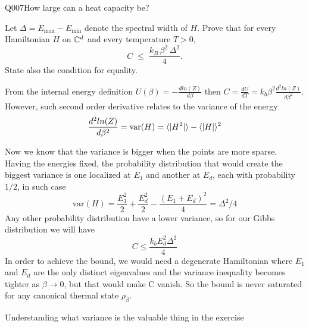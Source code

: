 \begin{entry}{Q007}{How large can a heat capacity be?}


\begin{problem}
Let $\Delta=E_{\max}-E_{\min}$ denote the spectral width of $H$. Prove that for every
Hamiltonian $H$ on $\mathbb{C}^{d}$ and every temperature $T>0$,
\[
  C \;\le\; \frac{k_B\,\beta^{2}\,\Delta^{2}}{4}.
\]
State also the condition for equality.
\end{problem}


\begin{solution}
From the internal energy definition
$U(\beta)= - \frac{ d ln(Z)}{d\beta}$
then
$C= \frac{dU}{dT}= k_b\beta^2 \frac{d^2 ln(Z)}{d\beta^2}.$
However, such second order derivative relates to the variance of the energy 
$$\frac{d^2 ln(Z)}{d\beta^2} = \text{var}(H)= \langle  \vert H^2 \vert  \rangle - \langle  \vert H \vert  \rangle^2 $$

Now we know that the variance is bigger when the points are more sparse. Having the energies fixed, the probability distribution that would create the biggest variance is one localized at $E_1$ and another at $E_d$, each with probability $1/2$, in such case 
$$\text{var}(H) = \frac{E_1^2}{2} + \frac{E_d^2}{2} - \frac{(E_1 + E_d)^2}{4} = \Delta^2/4$$
Any other probability distribution have a lower variance, so for our Gibbs distribution we will have
$$C \leq \frac{k_b E_d^2\Delta^2}{4}$$
In order to achieve the bound, we would need a degenerate Hamiltonian where $E_1$ and $E_d$ are the only distinct eigenvalues and the variance inequality becomes tighter as $\beta \rightarrow 0$, but that would make C vanish. So the bound is never saturated for any canonical thermal state $\rho_\beta$.
\end{solution}

\begin{takeaway}
Understanding what variance is the valuable thing in the exercise
\end{takeaway}


\end{entry}
